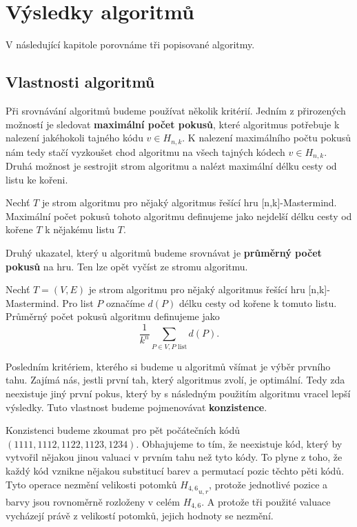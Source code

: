 \chapter{Výsledky algoritmů}
V následující kapitole porovnáme tři popisované algoritmy. 

\section{Vlastnosti algoritmů}
Při srovnávání algoritmů budeme používat několik kritérií. Jedním z přirozených možností je sledovat \textbf{maximální počet pokusů}, které algoritmus potřebuje k nalezení jakéhokoli tajného kódu $v \in H_{n,k}$. K nalezení maximálního počtu pokusů nám tedy stačí vyzkoušet chod algoritmu na všech tajných kódech $v \in H_{n,k}$. 
Druhá možnost je sestrojit strom algoritmu a nalézt maximální délku cesty od listu ke kořeni.

\begin{definice}\label{defmaxpocetpokusu}
    Nechť $T$ je strom algoritmu pro nějaký algoritmus řešící hru [n,k]-Mastermind. Maximální počet pokusů tohoto algoritmu definujeme jako nejdelší délku cesty od kořene $T$ k nějakému listu $T$. 
\end{definice}

Druhý ukazatel, který u algoritmů budeme srovnávat je \textbf{průměrný počet pokusů} na hru. Ten lze opět vyčíst ze stromu algoritmu.

\begin{definice}\label{defprumpocetpokusu}
    Nechť $T = (V,E)$ je strom algoritmu pro nějaký algoritmus řešící hru [n,k]-Mastermind. Pro list $P$ označíme $d(P)$ délku cesty od kořene k tomuto listu. Průměrný počet pokusů algoritmu definujeme jako 
    \[\frac{1}{k^n}\sum_{P\in V, P \text{ list}} d(P).\]
\end{definice}

Posledním kritériem, kterého si budeme u algoritmů všímat je výběr prvního tahu. Zajímá nás, jestli první tah, který algoritmus zvolí, je optimální. Tedy zda neexistuje jiný první pokus, který by s následným použitím algoritmu vracel lepší výsledky. Tuto vlastnost budeme pojmenovávat \textbf{konzistence}.

Konzistenci budeme zkoumat pro pět počátečních kódů $(1111, 1112, 1122, 1123, 1234)$. Obhajujeme to tím, že neexistuje kód, který by vytvořil nějakou jinou valuaci v prvním tahu než tyto kódy. To plyne z toho, že každý kód vznikne nějakou substitucí barev a permutací pozic těchto pěti kódů. Tyto operace nezmění velikosti potomků ${H_{4,6}}_{u,r}$, protože jednotlivé pozice a barvy jsou rovnoměrně rozloženy v celém $H_{4,6}$. A protože tři použité valuace vycházejí právě z velikostí potomků, jejich hodnoty se nezmění. 

